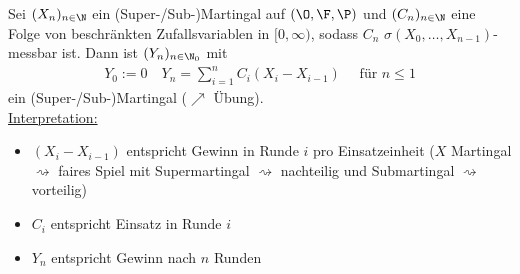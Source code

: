 \begin{example}
	Sei $(X_n)_{n\in \N}$ ein (Super-/Sub-)Martingal auf $(\O,\F,\P)$ und $(C_n)_{n\in \N}$ eine Folge von beschränkten Zufallsvariablen in $[0,\infty)$, sodass $C_n$ $\sigma(X_0,\dots,X_{n-1})$-messbar ist. Dann ist $(Y_n)_{n\in \N_0}$ mit
	\begin{align*}
		Y_0 := 0 \quad Y_n = \sum_{i=1}^n C_i (X_i -X_{i-1}) \quad \text{ für }n \le 1
	\end{align*}
	ein (Super-/Sub-)Martingal ($\nearrow$ Übung).\\ %
	\ul{Interpretation:}\\
	\begin{itemize}
		\item $(X_i - X_{i-1})$ entspricht Gewinn in Runde $i$ pro Einsatzeinheit ($X$ Martingal $\rightsquigarrow$ faires Spiel mit Supermartingal $\rightsquigarrow$ nachteilig und Submartingal $\rightsquigarrow$ vorteilig)
		\item $C_i$ entspricht Einsatz in Runde $i$
		\item $Y_n$ entspricht Gewinn nach $n$ Runden
	\end{itemize}
\end{example}
